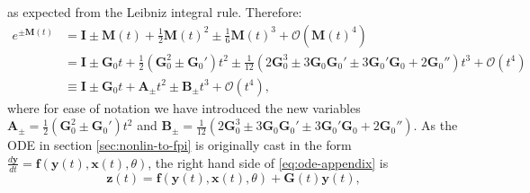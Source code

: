 as expected from the Leibniz integral rule. Therefore:
\begin{equation}
\begin{split}
    e^{\pm \mathbf{M}(t)} & = \mathbf{I} \pm \mathbf{M}(t) + \frac{1}{2}\mathbf{M}(t)^2 \pm \frac{1}{6}\mathbf{M}(t)^3 + \mathcal{O}(\mathbf{M}(t)^4) \\
    & = \mathbf{I} \pm \mathbf{G}_0t+\frac{1}{2}\left(\mathbf{G}_0^2 \pm \mathbf{G}_0'\right)t^2 \pm \frac{1}{12}\left(2\mathbf{G}_0^3 \pm 3\mathbf{G}_0\mathbf{G}_0' \pm 3\mathbf{G}_0'\mathbf{G}_0 + 2\mathbf{G}_0''\right)t^3 + \mathcal{O}(t^4) \\
    & \equiv \mathbf{I} \pm \mathbf{G}_0t+ \mathbf{A}_\pm t^2 \pm \mathbf{B}_\pm t^3 + \mathcal{O}(t^4),
\end{split}
\end{equation}
where for ease of notation we have introduced the new variables $\mathbf{A}_\pm = \frac{1}{2}\left(\mathbf{G}_0^2 \pm \mathbf{G}_0'\right)t^2$ and $\mathbf{B}_\pm = \frac{1}{12}\left(2\mathbf{G}_0^3 \pm 3\mathbf{G}_0\mathbf{G}_0' \pm 3\mathbf{G}_0'\mathbf{G}_0 + 2\mathbf{G}_0''\right)$. As the ODE in section \ref{sec:nonlin-to-fpi} is originally cast in the form $\frac{d\mathbf{y}}{dt} = \mathbf{f}(\mathbf{y}(t),\mathbf{x}(t),\theta)$, the right hand side of \ref{eq:ode-appendix} is
\begin{equation}
    \mathbf{z}(t) = \mathbf{f}(\mathbf{y}(t), \mathbf{x}(t),\theta)+\mathbf{G}(t)\mathbf{y}(t),
\end{equation}

